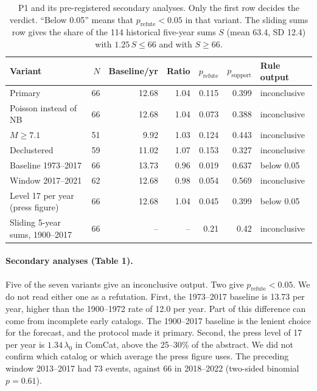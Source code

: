 \documentclass[11pt]{article}
\begin{document}
\begin{table}[t]
\centering\footnotesize
\begin{tabular}{lrrrrrl}
\toprule
Variant & $N$ & Baseline/yr & Ratio & $p_{\text{refute}}$ & $p_{\text{support}}$ & Rule output\\
\midrule
Primary & 66 & 12.68 & 1.04 & 0.115 & 0.399 & inconclusive\\
Poisson instead of NB & 66 & 12.68 & 1.04 & 0.073 & 0.388 & inconclusive\\
$M\ge7.1$ & 51 & 9.92 & 1.03 & 0.124 & 0.443 & inconclusive\\
Declustered & 59 & 11.02 & 1.07 & 0.153 & 0.327 & inconclusive\\
Baseline 1973--2017 & 66 & 13.73 & 0.96 & 0.019 & 0.637 & below 0.05\\
Window 2017--2021 & 62 & 12.68 & 0.98 & 0.054 & 0.569 & inconclusive\\
Level 17 per year (press figure) & 66 & 12.68 & 1.04 & 0.045 & 0.399 & below 0.05\\
Sliding 5-year sums, 1900--2017 & 66 & -- & -- & 0.21 & 0.42 & inconclusive\\
\bottomrule
\end{tabular}
\caption{P1 and its pre-registered secondary analyses. Only the first row decides the verdict. ``Below 0.05'' means that $p_{\text{refute}} < 0.05$ in that variant. The sliding sums row gives the share of the 114 historical five-year sums $S$ (mean 63.4, SD 12.4) with $1.25\,S \le 66$ and with $S \ge 66$.}
\end{table}

\paragraph{Secondary analyses (Table 1).} Five of the seven variants give an inconclusive output. Two give $p_{\text{refute}} < 0.05$. We do not read either one as a refutation. First, the 1973--2017 baseline is 13.73 per year, higher than the 1900--1972 rate of 12.0 per year. Part of this difference can come from incomplete early catalogs. The 1900--2017 baseline is the lenient choice for the forecast, and the protocol made it primary. Second, the press level of 17 per year is $1.34\,\lambda_0$ in ComCat, above the 25--30\% of the abstract. We did not confirm which catalog or which average the press figure uses. The preceding window 2013--2017 had 73 events, against 66 in 2018--2022 (two-sided binomial $p = 0.61$).
\end{document}
